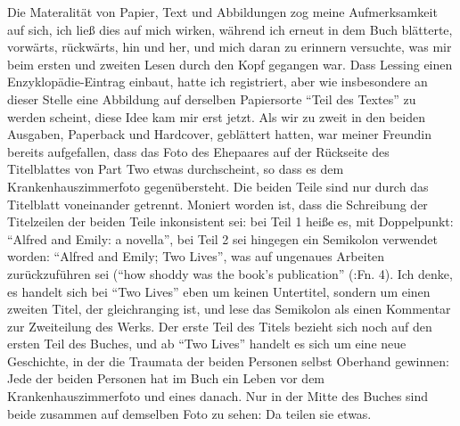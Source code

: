\documentclass[fontsize=12pt]{scrartcl}
\begin{document}
Die Materalit\"at von Papier, Text und Abbildungen zog meine Aufmerksamkeit auf sich, ich lie{\ss} dies auf mich wirken, w\"ahrend ich erneut in dem Buch bl\"atterte, vorw\"arts, r\"uckw\"arts, hin und her, und mich daran zu erinnern versuchte, was mir beim ersten und zwei\-ten Lesen durch den Kopf gegangen war. Dass Lessing einen Enzyklop\"adie-Eintrag einbaut, hatte ich registriert, aber wie insbesondere an dieser Stelle eine Abbildung auf derselben Papiersorte "`Teil des Textes"' zu werden scheint, diese Idee kam mir erst jetzt. Als wir zu zweit in den beiden Ausgaben, Paperback und Hardcover, gebl\"attert hatten, war meiner Freundin\textsuperscript{\tiny *} bereits aufgefallen, dass das Foto des Ehepaares auf der R\"uckseite des Titelblattes von Part Two etwas durchscheint, so dass es dem Krankenhauszimmerfoto gegen\"ubersteht. Die beiden Teile sind nur durch das Titelblatt voneinander getrennt. Moniert worden ist, dass die Schreibung der Titelzeilen der beiden Teile inkonsistent sei: bei Teil 1 hei{\ss}e es, mit Doppelpunkt: "`Alfred and Emily: a novella"', bei Teil 2 sei hingegen ein Semikolon verwendet worden: "`Alfred and Emily; Two Lives"', was auf ungenaues Arbei\-ten zur\"uckzuf\"uhren sei ("`how shoddy was the book's publication"' (\cite{Tiger2009}:Fn. 4). Ich denke, es handelt sich bei "`Two Lives"' eben um keinen Untertitel, sondern um einen zwei\-ten Titel, der gleichranging ist, und lese das Semikolon als einen Kommentar zur Zweiteilung des Werks. Der erste Teil des Titels bezieht sich noch auf den ersten Teil des Buches, und ab "`Two Lives"' handelt es sich um eine neue Geschichte, in der die Traumata der beiden Per\-so\-nen \mbox{selbst} Oberhand gewinnen: Jede der beiden Per\-so\-nen hat im Buch ein Leben vor dem Krankenhauszimmerfoto und eines danach. Nur in der Mitte des Buches sind beide zusammen auf demselben Foto zu sehen: Da teilen sie etwas.
\end{document}
